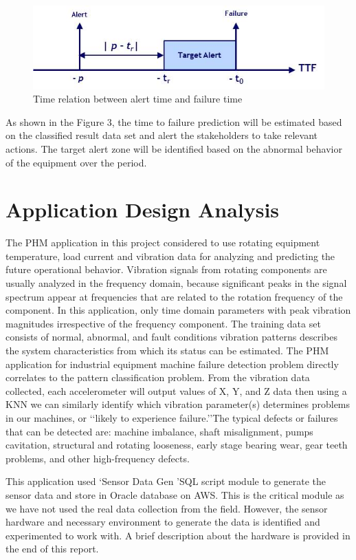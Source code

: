 \documentclass[sigconf]{acmart}
\begin{document}
\begin{figure}
\includegraphics[width=1.0\columnwidth]{images/ttf_1}
\caption{Time relation between alert time and failure time} \label{fig:Figure3}
\end{figure}

As shown in the Figure 3, the time to failure prediction will be estimated based on the classified result data set and alert the stakeholders to take relevant actions. The target alert zone will be identified based on the abnormal behavior of the equipment over the period.

\section{Application Design Analysis}
The PHM application in this project considered to use rotating equipment temperature, load current and vibration data for analyzing and predicting the future operational behavior. 
Vibration signals from rotating components are usually analyzed in the frequency domain, because significant peaks in the signal spectrum appear at frequencies that are related to the rotation frequency of the component. In this application, only time domain parameters with peak vibration magnitudes irrespective of the frequency component. The training data set consists of normal, abnormal, and fault conditions vibration patterns describes the system characteristics from which its status can be estimated.
The PHM application for industrial equipment machine failure detection problem directly correlates to the pattern classification problem. From the vibration data collected, each accelerometer will output values of X, Y, and Z data then using a KNN we can similarly identify which vibration parameter(s) determines problems in our machines, or \lq\lq likely to experience failure.\rq\rq The typical defects or failures that can be detected are: machine imbalance, shaft misalignment, pumps cavitation, structural and rotating looseness, early stage bearing wear, gear teeth problems, and other high-frequency defects.

This application used \lq Sensor Data Gen \rq SQL script module to generate the sensor data and store in Oracle database on AWS. This is the critical module as we have not used the real data collection from the field. However, the sensor hardware and necessary environment to generate the data is identified and experimented to work with. A brief description about the hardware is provided in the end of this report.
\end{document}
